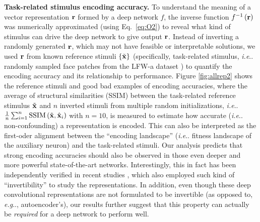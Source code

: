 \documentclass[fleqn]{article} %
\makeatletter
\DeclareRobustCommand\onedot{\futurelet\@let@token\@onedot}
\def\@onedot{\ifx\@let@token.\else.\null\fi\xspace}
\def\eg{\emph{e.g}\onedot} \def\Eg{\emph{E.g}\onedot}
\def\ie{\emph{i.e}\onedot} \def\Ie{\emph{I.e}\onedot}
\makeatother
\begin{document}
{\bf Task-related stimulus encoding accuracy.}
To understand the meaning of a vector representation ${\bf{r}}$ formed by a deep network $f$, the inverse function $f^{-1}\left( \bf{r} \right)$ {was} numerically approximated (using Eq.~\ref{eq:O2}) to reveal what kind of stimulus can drive the deep network to give output $\bf{r}$.
Instead of inverting a randomly generated $\bf{r}$, which may not have feasible or interpretable solutions, we {used} $\bf{r}$ from known reference stimuli $\lbrace\tilde{\bf{x}}\rbrace$ (specifically, task-related stimulus, \ie randomly sampled face patches from the LFW-a dataset \cite{wolf2011effective}) to quantify the encoding accuracy and its relationship to performance.
Figure \ref{fig:allrep2} shows the reference stimuli and good \vs bad examples of encoding accuracies, where the average of structural similarities (SSIM) \cite{wang2004image} between the task-related reference stimulus $\tilde{\bf{x}}$ and $n$ inverted stimuli from multiple random initializations, \ie $\frac{1}{n}\sum_{i=1}^{n} \mathrm{SSIM}\left(\tilde{\bf{x}} , \hat{{\bf{x}}}_i \right)$ with $n=10$, is measured to estimate how accurate (\ie non-confounding) a representation is encoded.
This can also be interpreted as the first-oder alignment between the ``encoding landscape'' (\ie fitness landscape of the auxiliary neuron) and the task-related stimuli.
Our analysis predicts that strong encoding accuracies should also be observed in those even deeper and more powerful state-of-the-art networks. 
Interestingly, this in fact has been independently verified in recent studies \cite{mahendran2014understanding, long2014convnets, razavian2014persistent}, which also employed such kind of ``invertibility'' to study the representations. %
In addition, even though these deep convolutional representations are not formulated to be invertible (as opposed to, \eg, autoencoder's), our results further suggest that this property can actually be \emph{required} for a deep network to perform well.

\end{document}
